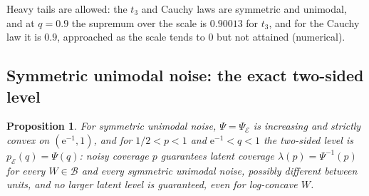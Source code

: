 \documentclass[11pt]{article}
\renewcommand{\_}{\usc\allowbreak}
\newtheorem{proposition}{Proposition}
\begin{document}
Heavy tails are allowed: the $t_3$ and Cauchy laws are symmetric and unimodal, and at $q = 0.9$ the supremum over the scale is $0.90013$ for $t_3$, and for the Cauchy law it is $0.9$, approached as the scale tends to $0$ but not attained (numerical).

\subsection*{Symmetric unimodal noise: the exact two-sided level}

\begin{proposition}\label{prop:su-exact}
For symmetric unimodal noise, $\Psi = \Psi_{\mathcal E}$ is increasing and strictly convex on $(\mathrm{e}^{-1}, 1)$, and for $1/2 < p < 1$ and $\mathrm{e}^{-1} < q < 1$ the two-sided level is $p_{\mathcal E}(q) = \Psi(q)$: noisy coverage $p$ guarantees latent coverage $\lambda(p) = \Psi^{-1}(p)$ for every $W \in \mathcal B$ and every symmetric unimodal noise, possibly different between units, and no larger latent level is guaranteed, even for log-concave $W$.
\end{proposition}
\end{document}
